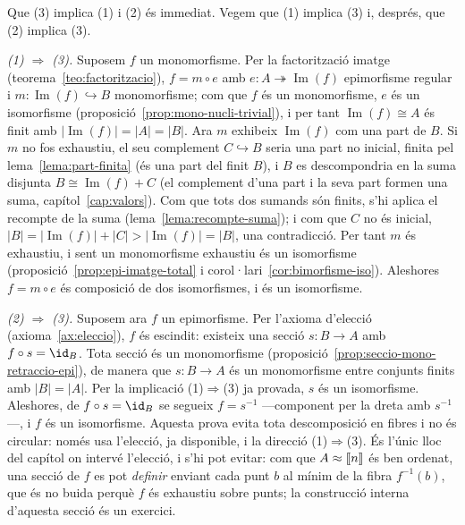 \begin{prova}
Que (3) implica (1) i (2) és immediat. Vegem que (1) implica (3) i,
després, que (2) implica (3).

\emph{(1) \(\Rightarrow\) (3).} Suposem \(f\) un monomorfisme. Per la
factorització imatge (teorema~\ref{teo:factoritzacio}), \(f=m\circ e\) amb
\(e\colon A\twoheadrightarrow\operatorname{Im}(f)\) epimorfisme regular i
\(m\colon\operatorname{Im}(f)\hookrightarrow B\) monomorfisme; com que
\(f\) és un monomorfisme, \(e\) és un isomorfisme
(proposició~\ref{prop:mono-nucli-trivial}), i per tant
\(\operatorname{Im}(f)\cong A\) és finit amb
\(|\operatorname{Im}(f)|=|A|=|B|\). Ara \(m\) exhibeix
\(\operatorname{Im}(f)\) com una part de \(B\). Si \(m\) no fos exhaustiu,
el seu complement \(C\hookrightarrow B\) seria una part no inicial, finita
pel lema~\ref{lema:part-finita} (és una part del finit \(B\)), i \(B\) es
descompondria en la suma disjunta \(B\cong\operatorname{Im}(f)+C\)
(el complement d'una part i la seva part formen una suma,
capítol~\ref{cap:valors}). Com que tots dos sumands són finits, s'hi aplica
el recompte de la suma (lema~\ref{lema:recompte-suma}); i com que \(C\) no
és inicial, \(|B|=|\operatorname{Im}(f)|+|C|>|\operatorname{Im}(f)|=|B|\),
una contradicció. Per tant \(m\) és exhaustiu, i sent un monomorfisme
exhaustiu és un isomorfisme (proposició~\ref{prop:epi-imatge-total} i
corol·lari~\ref{cor:bimorfisme-iso}). Aleshores \(f=m\circ e\) és
composició de dos isomorfismes, i és un isomorfisme.

\emph{(2) \(\Rightarrow\) (3).} Suposem ara \(f\) un epimorfisme. Per
l'axioma d'elecció (axioma~\ref{ax:eleccio}), \(f\) és escindit: existeix
una secció
\(s\colon B\to A\) amb \(f\circ s=\id_B\). Tota secció és un monomorfisme
(proposició~\ref{prop:seccio-mono-retraccio-epi}), de manera que
\(s\colon B\to A\) és un monomorfisme entre conjunts finits amb
\(|B|=|A|\). Per la implicació (1)\(\Rightarrow\)(3) ja provada, \(s\) és un
isomorfisme. Aleshores, de \(f\circ s=\id_B\) se segueix \(f=s^{-1}\)
---component per la dreta amb \(s^{-1}\)---, i \(f\) és un isomorfisme.
Aquesta prova evita tota descomposició en fibres i no és circular: només
usa l'elecció, ja disponible, i la direcció (1)\(\Rightarrow\)(3). És
l'únic lloc del capítol on intervé l'elecció, i s'hi pot evitar: com que
\(A\approx\llbracket n\rrbracket\) és ben ordenat, una secció de \(f\) es pot
\emph{definir} enviant cada punt \(b\) al mínim de la fibra \(f^{-1}(b)\),
que és no buida perquè \(f\) és exhaustiu sobre punts; la construcció
interna d'aquesta secció és un exercici.
\end{prova}

